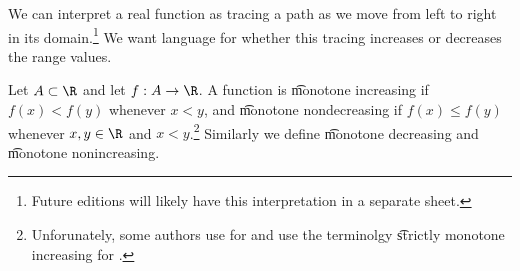 

We can interpret a real function as tracing a path as we move from left to right in its domain.\footnote{Future editions will likely have this interpretation in a separate sheet.}
We want language for whether this tracing increases or decreases the range values.


Let $A \subset \R$ and let $f: A \to \R$.
A function is \t{monotone increasing} if $f(x) < f(y)$ whenever $x < y$, and \t{monotone nondecreasing} if $f(x) \leq f(y)$ whenever $x, y \in \R$ and $x < y$.\footnote{Unforunately, some authors use  for  and use the terminolgy \t{strictly monotone increasing} for .}
Similarly we define \t{monotone decreasing} and \t{monotone nonincreasing}.

\blankpage
